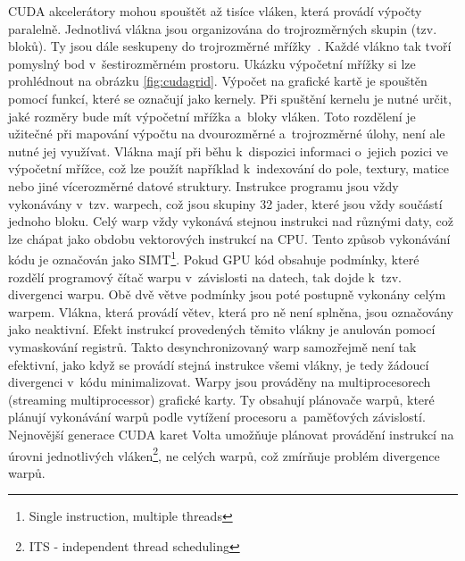 CUDA akcelerátory mohou spouštět až tisíce vláken, která provádí výpočty paralelně. Jednotlivá vlákna jsou organizována do trojrozměrných skupin (tzv. bloků). Ty jsou dále seskupeny do trojrozměrné mřížky~\cite{cudacguide}. Každé vlákno tak tvoří pomyslný bod v~šestirozměrném prostoru. Ukázku výpočetní mřížky si lze prohlédnout na obrázku \ref{fig:cudagrid}. Výpočet na grafické kartě je spouštěn pomocí funkcí, které se označují jako kernely. Při spuštění kernelu je nutné určit, jaké rozměry bude mít výpočetní mřížka a~bloky vláken. Toto rozdělení je užitečné při mapování výpočtu na dvourozměrné a~trojrozměrné úlohy, není ale nutné jej využívat. Vlákna mají při běhu k~dispozici informaci o~jejich pozici ve výpočetní mřížce, což lze použít například k~indexování do pole, textury, matice nebo jiné vícerozměrné datové struktury. Instrukce programu jsou vždy vykonávány v~tzv. warpech, což jsou skupiny 32 jader, které jsou vždy součástí jednoho bloku. Celý warp vždy vykonává stejnou instrukci nad různými daty, což lze chápat jako obdobu vektorových instrukcí na CPU. Tento způsob vykonávání kódu je označován jako SIMT\footnote{Single instruction, multiple threads}. Pokud GPU kód obsahuje podmínky, které rozdělí programový čítač warpu v~závislosti na datech, tak dojde k~tzv. divergenci warpu. Obě dvě větve podmínky jsou poté postupně vykonány celým warpem. Vlákna, která provádí větev, která pro ně není splněna, jsou označovány jako neaktivní. Efekt instrukcí provedených těmito vlákny je anulován pomocí vymaskování registrů. Takto desynchronizovaný warp samozřejmě není tak efektivní, jako když se provádí stejná instrukce všemi vlákny, je tedy žádoucí divergenci v~kódu minimalizovat. Warpy jsou prováděny na multiprocesorech (streaming multiprocessor) grafické karty. Ty obsahují plánovače warpů, které plánují vykonávání warpů podle vytížení procesoru a~paměťových závislostí. Nejnovější generace CUDA karet Volta umožňuje plánovat provádění instrukcí na úrovni jednotlivých vláken\footnote{ITS - independent thread scheduling}, ne celých warpů, což zmírňuje problém divergence warpů.


